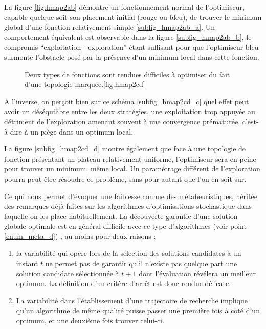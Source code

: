 La figure \ref{fig:hmap2ab} démontre un fonctionnement normal de l'optimiseur, capable quelque soit son placement initial (rouge ou bleu), de trouver le minimum global d'une fonction relativement simple \ref{subfig_hmap2ab_a}. Un comportement équivalent est observable dans la figure \ref{subfig_hmap2ab_b}, le compromis \enquote{exploitation - exploration} étant suffisant pour que l'optimiseur bleu surmonte l'obstacle posé par la présence d'un minimum local dans cette fonction.

\begin{figure}[!htbp]
  \begin{sidecaption}[fortoc]{Deux types de fonctions sont rendues difficiles à optimiser du fait d'une topologie marquée.}[fig:hmap2cd]
  \centering
  \qquad
 \end{sidecaption}
\end{figure}

A l'inverse, on perçoit bien sur ce schéma \ref{subfig_hmap2cd_c} quel effet peut avoir un déséquilibre entre les deux stratégies, une exploitation trop appuyée au détriment de l'exploration amenant souvent à une convergence  prématurée, c'est-à-dire à un piège dans un optimum local.

La figure \ref{subfig_hmap2cd_d} montre également que face à une topologie de fonction présentant un plateau relativement uniforme, l'optimiseur sera en peine pour trouver un minimum, même local. Un paramétrage différent de l'exploration pourra peut être résoudre ce problème, sans pour autant que l'on en soit sur.

Ce qui nous permet d'évoquer une faiblesse connue des métaheuristiques, héritée des remarques déjà faites sur les algorithmes d'optimisations stochastique  dans laquelle on les place habituellement. La découverte garantie d'une solution globale optimale est en général difficile avec ce type d'algorithmes (voir point \ref{enum_meta_d}) , au moins pour deux raisons :

\begin{enumerate}
\item la variabilité qui opère lors de la selection des solutions candidates à un instant $t$ ne permet pas de garantir qu'il n'existe pas quelque part une solution candidate sélectionnée à $t+1$ dont l'évaluation révélera un meilleur optimum. La définition d'un critère d'arrêt est donc rendue délicate.
\item La variabilité dans l'établissement d'une trajectoire de recherche implique qu'un algorithme de même qualité puisse passer une première fois à coté d'un optimum, et une deuxième fois trouver celui-ci.
\end{enumerate}

